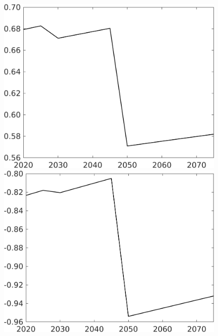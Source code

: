\begin{figure}[h!!]
\begin{minipage}[]{0.32\textwidth}
\end{minipage}
	\begin{minipage}[]{0.32\textwidth}
	\includegraphics[width=1\textwidth]{../../codding_model/own_basedOnFried/optimalPol_elastS_DisuSci/figures/all_1705/Single_OPT_T_NoTaus_C_spillover0_sep1_BN0_ineq0_etaa0.79.png}
\end{minipage}
\begin{minipage}[]{0.32\textwidth}
	\includegraphics[width=1\textwidth]{../../codding_model/own_basedOnFried/optimalPol_elastS_DisuSci/figures/all_1705/Single_OPT_T_NoTaus_SWF_spillover0_sep1_BN0_ineq0_etaa0.79.png}

\end{minipage}
\end{figure}

